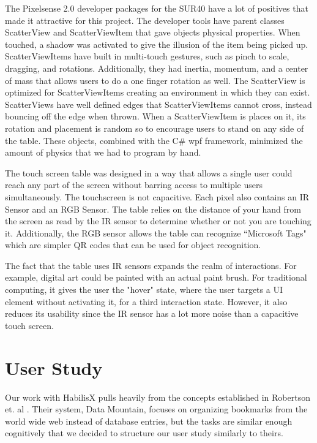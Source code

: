 \documentclass{article}
\begin{document}
The Pixelsense 2.0 developer packages for the SUR40 have a lot of positives that made it attractive for this project.  The developer tools have parent classes ScatterView and ScatterViewItem that gave objects physical properties.  When touched, a shadow was activated to give the illusion of the item being picked up.  ScatterViewItems have built in multi-touch gestures, such as pinch to scale, dragging, and rotations. Additionally, they had inertia, momentum, and a center of mass that allows users to do a one finger rotation as well.  The ScatterView is optimized for ScatterViewItems creating an environment in which they can exist.  ScatterViews have well defined edges that ScatterViewItems cannot cross, instead bouncing off the edge when thrown.  When a ScatterViewItem is places on it, its rotation and placement is random so to encourage users to stand on any side of the table.  These objects, combined with the C\# wpf framework, minimized the amount of physics that we had to program by hand.

The touch screen table was designed in a way that allows a single user could reach any part of the screen without barring access to multiple users simultaneously.  The touchscreen is not capacitive.  Each pixel also contains an IR Sensor and an RGB Sensor.  The table relies on the distance of your hand from the screen as read by the IR sensor to determine whether or not you are touching it.  Additionally, the RGB sensor allows the table can recognize ``Microsoft Tags" which are simpler QR codes that can be used for object recognition.  

The fact that the table uses IR sensors expands the realm of interactions.  For example, digital art could be painted with an actual paint brush.  For traditional computing, it gives the user the "hover" state, where the user targets a UI element without activating it, for a third interaction state.  However, it also reduces its usability since the IR sensor has a lot more noise than a capacitive touch screen.  

\section{User Study}

Our work with HabilisX pulls heavily from the concepts established in Robertson et. al \cite{Robertson1998}.  Their system, Data Mountain, focuses on organizing bookmarks from the world wide web instead of database entries, but the tasks are similar enough cognitively that we decided to structure our user study similarly to theirs.  
\end{document}

